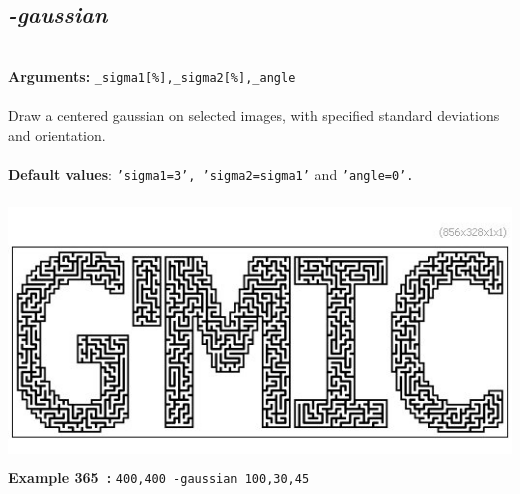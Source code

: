 \documentclass[a4paper,11pt,twoside]{book}
\begin{document}
\subsection{\emph{-gaussian} }\vspace*{-0.5em}
~\\\textbf{Arguments: } 
{\small \texttt{\_sigma1[\%],\_sigma2[\%],\_angle}}\\~\\
Draw a centered gaussian on selected images, with specified standard deviations and orientation.
~\\~\\\textbf{Default values}: {\small \texttt{'sigma1=3', 'sigma2=sigma1'} and \texttt{'angle=0'.}}
\begin{center}\includegraphics[keepaspectratio=true,height=7cm,width=\textwidth]{img/gmic_def365.jpg}\\
{\footnotesize \textbf{Example 365~:} \texttt{400,400 -gaussian 100,30,45}}
\end{center}
\end{document}
